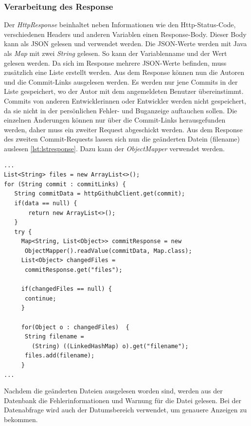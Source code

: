 \subsubsection{Verarbeitung des Response}
Der \textit{HttpResponse} beinhaltet neben Informationen wie den Http-Status-Code, verschiedenen Headers und anderen Variablen einen Response-Body. Dieser Body kann als JSON gelesen und verwendet werden. Die JSON-Werte werden mit Java als \textit{Map} mit zwei \textit{String} gelesen. So kann der Variablenname und der Wert gelesen werden. Da sich im Response mehrere JSON-Werte befinden, muss zusätzlich eine Liste erstellt werden. Aus dem Response können nun die Autoren und die Commit-Links ausgelesen werden. Es werden nur jene Commits in der Liste gespeichert, wo der Autor mit dem angemeldeten Benutzer übereinstimmt. Commits von anderen Entwicklerinnen oder Entwickler werden nicht gespeichert, da sie nicht in der persönlichen Fehler- und Buganzeige auftauchen sollen. Die einzelnen Änderungen können nur über die Commit-Links herausgefunden werden, daher muss ein zweiter Request abgeschickt werden. Aus dem Response des zweiten Commit-Requests lassen sich nun die geänderten Datein (filename) auslesen \ref{lst:lstresponse}. Dazu kann der \textit{ObjectMapper} verwendet werden.
\lstset{
  caption=[Auslesen der geänderten Files aus der Github-API.]{Auslesen der geänderten Files aus der Github-API. Die Links für die Commits müssen in einem eigenen Request vom Repository ausgelesen werden.}, 
  basicstyle=\small\ttfamily, 
  label=lst:lstresponse, 
  language=Java,
  frame=single,
  breaklines=true, %
  postbreak=\mbox{\textcolor{red}{$\hookrightarrow$}\space},
}
\begin{samepage}%
	\begin{lstlisting}[float=tbhp]
...
List<String> files = new ArrayList<>();
for (String commit : commitLinks) {
   String commitData = httpGithubClient.get(commit);
   if(data == null) {
       return new ArrayList<>();
   }
   try {
     Map<String, List<Object>> commitResponse = new   
      ObjectMapper().readValue(commitData, Map.class);
     List<Object> changedFiles = 
      commitResponse.get("files");

     if(changedFiles == null) {
      continue;
     }

     for(Object o : changedFiles)  {
      String filename = 
        (String) ((LinkedHashMap) o).get("filename");
      files.add(filename);
     }
...     
	\end{lstlisting}
\end{samepage}
Nachdem die geänderten Dateien ausgelesen worden sind, werden aus der Datenbank die Fehlerinformationen und Warnung für die Datei gelesen. Bei der Datenabfrage wird auch der Datumsbereich verwendet, um genauere Anzeigen zu bekommen.
